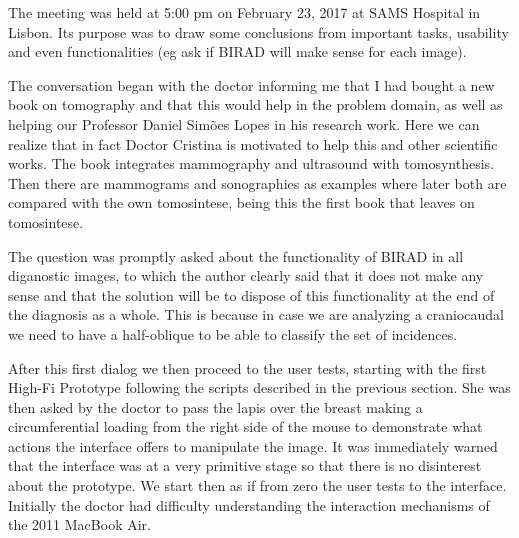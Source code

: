 The meeting was held at 5:00 pm on February 23, 2017 at SAMS Hospital in Lisbon. Its purpose was to draw some conclusions from important tasks, usability and even functionalities (eg ask if BIRAD will make sense for each image).

The conversation began with the doctor informing me that I had bought a new book on tomography and that this would help in the problem domain, as well as helping our Professor Daniel Sim\~{o}es Lopes in his research work. Here we can realize that in fact Doctor Cristina is motivated to help this and other scientific works. The book integrates mammography and ultrasound with tomosynthesis. Then there are mammograms and sonographies as examples where later both are compared with the own tomosintese, being this the first book that leaves on tomosintese.

The question was promptly asked about the functionality of BIRAD in all diganostic images, to which the author clearly said that it does not make any sense and that the solution will be to dispose of this functionality at the end of the diagnosis as a whole. This is because in case we are analyzing a craniocaudal we need to have a half-oblique to be able to classify the set of incidences.

After this first dialog we then proceed to the user tests, starting with the first High-Fi Prototype following the scripts described in the previous section. She was then asked by the doctor to pass the lapis over the breast making a circumferential loading from the right side of the mouse to demonstrate what actions the interface offers to manipulate the image. It was immediately warned that the interface was at a very primitive stage so that there is no disinterest about the prototype. We start then as if from zero the user tests to the interface. Initially the doctor had difficulty understanding the interaction mechanisms of the 2011 MacBook Air.

\clearpage

